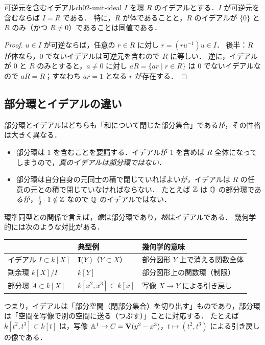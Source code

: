\begin{myprop}{可逆元を含むイデアル}{ch02-unit-ideal}
$I$ を環 $R$ のイデアルとする．$I$ が可逆元を含むならば $I=R$ である．
特に，$R$ が体であることと，$R$ のイデアルが $\{0\}$ と $R$ のみ（かつ $R\ne0$）であることは同値である．
\end{myprop}

\begin{proof}
$u\in I$ が可逆ならば，任意の $r\in R$ に対し $r=(ru^{-1})u\in I$．
後半：$R$ が体なら，$0$ でないイデアルは可逆元を含むので $R$ に等しい．
逆に，イデアルが $0$ と $R$ のみとすると，$a\ne0$ に対し $aR=\{ar\mid r\in R\}$ は $0$ でないイデアルなので $aR=R$；すなわち $ar=1$ となる $r$ が存在する．
\end{proof}

\subsection{部分環とイデアルの違い}

部分環とイデアルはどちらも「和について閉じた部分集合」であるが，その性格は大きく異なる．
\begin{itemize}
  \item 部分環は $1$ を含むことを要請する．イデアルが $1$ を含めば $R$ 全体になってしまうので，\emph{真のイデアルは部分環ではない}．
  \item 部分環は自分自身の元同士の積で閉じていればよいが，イデアルは $R$ の任意の元との積で閉じていなければならない．
        たとえば $\mathbb{Z}$ は $\mathbb{Q}$ の部分環であるが，$\frac12\cdot1\notin\mathbb{Z}$ なので $\mathbb{Q}$ のイデアルではない．
\end{itemize}
環準同型との関係で言えば，\emph{像}は部分環であり，\emph{核}はイデアルである．
幾何学的には次のような対比がある．

\begin{table}[H]
\centering
\begin{tabular}{lll}
\hline
 & 典型例 & 幾何学的意味 \\
\hline
イデアル $I\subset k[X]$ & $\mathbf{I}(Y)$（$Y\subset X$）& 部分図形 $Y$ 上で消える関数全体 \\
剰余環 $k[X]/I$ & $k[Y]$ & 部分図形上の関数環（制限）\\
部分環 $A\subset k[X]$ & $k[x^2,x^3]\subset k[x]$ & 写像 $X\to Y$ による引き戻し \\
\hline
\end{tabular}
\end{table}

つまり，イデアルは「部分空間（閉部分集合）を切り出す」ものであり，部分環は「空間を写像で別の空間に送る（つぶす）」ことに対応する．
たとえば $k[t^2,t^3]\subset k[t]$ は，写像 $\mathbb{A}^1\to C=\mathbf{V}(y^2-x^3)$，$t\mapsto(t^2,t^3)$ による引き戻しの像である．

